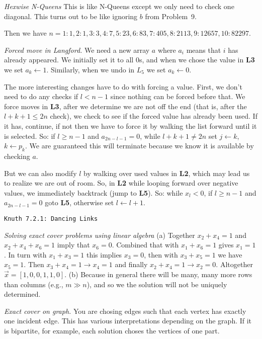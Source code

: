 {\it Hexwise N-Queens}\hfil\break
This is like N-Queens except we only need to check one diagonal.  This turns out
to be like ignoring $b$ from Problem~9.

Then we have $n=1: 1, 2: 1, 3: 3, 4: 7, 5: 23, 6: 83, 7: 405, 8: 2113, 9: 12657,
10: 82297$.

 {\it Forced move in Langford.}\hfil\break
We need a new array $a$ where $a_i$ means that $i$ has already appeared.
We initially set it to all 0s, and when we chose the value in {\bf L3}
we set $a_k \leftarrow 1$.  Similarly, when we undo in $L_5$ we set
$a_k \leftarrow 0$.

The more interesting changes have to do with forcing a value.  First,
we don't need to do any checks if $l < n - 1$ since nothing can be forced
before that.  We force moves in {\bf L3}, after we determine we are not
off the end (that is, after the $l + k + 1 \le 2 n$ check), we check to see 
if the forced value has already been used.  If it has, continue, if not
then we have to force it by walking the list forward until it is selected.
So: if $l \ge n - 1$ and $a_{2n - l - 1} = 0$, while $l + k + 1 \ne 2 n$
set $j \leftarrow k$, $k \leftarrow p_k$.  We are guaranteed this will
terminate because we know it is available by checking $a$.

But we can also modify $l$ by walking over used values in {\bf L2}, which
may lead us to realize we are out of room.  So, in {\bf L2} while looping
forward over negative values, we immediately backtrack (jump to {\bf L5}).
So: while $x_l < 0$, if $l \ge n - 1$ and $a_{2 n - l - 1} = 0$ goto {\bf L5},
otherwise set $l \leftarrow l + 1$.


\topglue 0.5in
\centerline{\tt Knuth 7.2.1: Dancing Links}
\vskip 0.3in

 {\it Solving exact cover problems using
linear algebra}\hfil\break
(a) Together $x_2 + x_4 = 1$ and $x_2 + x_4 + x_6 = 1$
imply that $x_6 = 0$.  Combined that with $x_1 + x_6 = 1$
gives $x_1 = 1$.  In turn with $x_1 + x_3 = 1$ this implies
$x_3 = 0$, then with $x_3 + x_5 = 1$ we have $x_5 = 1$.
Then $x_3 + x_4 = 1 \rightarrow x_4 = 1$ and finally
$x_2 + x_4 = 1 \rightarrow x_2 = 0$.  Altogether
$\vec{x} = [1, 0, 0, 1, 1, 0]$.\hfil\break
(b) Because in general there will be many, many more
rows than columns (e.g., $m \gg n$), and so we the solution
will not be uniquely determined.

 {\it Exact cover on graph.}\hfil\break
You are chosing edges such that each vertex has exactly one incident edge.
This has various interpretations depending on the graph.  If it is bipartite, for
example, each solution choses the vertices of one part.

